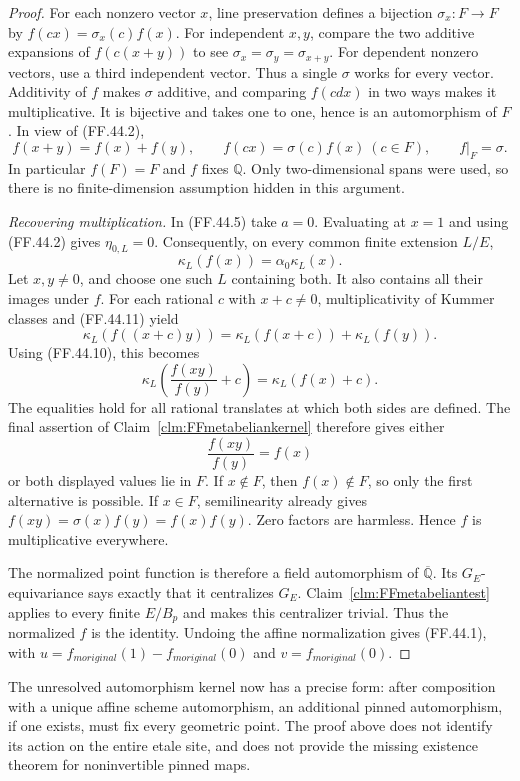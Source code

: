 \begin{proof}
For each nonzero vector \(x\),
line preservation defines a bijection
\(\sigma_x:F\to F\) by
\(f(cx)=\sigma_x(c)f(x)\).
For independent \(x,y\), compare
the two additive expansions of
\(f(c(x+y))\) to see
\(\sigma_x=\sigma_y=\sigma_{x+y}\).
For dependent nonzero vectors,
use a third independent vector.
Thus a single \(\sigma\) works
for every vector. Additivity of
\(f\) makes \(\sigma\) additive,
and comparing \(f(cd x)\) in
two ways makes it multiplicative.
It is bijective and takes one
to one, hence is an automorphism
of \(F\). In view of (FF.44.2),
\[
      f(x+y)=f(x)+f(y),\qquad
      f(cx)=\sigma(c)f(x)\ (c\in F),\qquad
      f|_F=\sigma.
                                                        \tag{FF.44.10}
\]
In particular \(f(F)=F\) and
\(f\) fixes \(\mathbb Q\).
Only two-dimensional spans were
used, so there is no finite-dimension
assumption hidden in this argument.

\emph{Recovering multiplication.}
In (FF.44.5) take \(a=0\).
Evaluating at \(x=1\) and using
(FF.44.2) gives \(\eta_{0,L}=0\).
Consequently, on every common finite
extension \(L/E\),
\[
                            \kappa_L(f(x))
                                   =\alpha_0\kappa_L(x).
                                                        \tag{FF.44.11}
\]
Let \(x,y\ne0\), and choose
one such \(L\) containing both.
It also contains all their images
under \(f\). For each rational
\(c\) with \(x+c\ne0\),
multiplicativity of Kummer classes
and (FF.44.11) yield
\[
       \kappa_L(f((x+c)y))
                     =\kappa_L(f(x+c))+\kappa_L(f(y)).
\]
Using (FF.44.10), this becomes
\[
       \kappa_L\!\left(\frac{f(xy)}{f(y)}+c\right)
                     =\kappa_L(f(x)+c).
                                                        \tag{FF.44.12}
\]
The equalities hold for all rational
translates at which both sides
are defined. The final assertion
of Claim~\ref{clm:FFmetabeliankernel}
therefore gives either
\[
                        \frac{f(xy)}{f(y)}=f(x)
\]
or both displayed values lie in
\(F\). If \(x\notin F\),
then \(f(x)\notin F\), so
only the first alternative is
possible. If \(x\in F\),
semilinearity already gives
\(f(xy)=\sigma(x)f(y)=f(x)f(y)\).
Zero factors are harmless. Hence
\(f\) is multiplicative everywhere.

The normalized point function is
therefore a field automorphism of
\(\overline{\mathbb Q}\).
Its \(G_E\)-equivariance says exactly
that it centralizes \(G_E\).
Claim~\ref{clm:FFmetabeliantest}
applies to every finite \(E/B_p\)
and makes this centralizer trivial.
Thus the normalized \(f\) is
the identity. Undoing the affine
normalization gives (FF.44.1), with
\(u=f_{
m original}(1)-f_{
m original}(0)\)
and \(v=f_{
m original}(0)\).
\end{proof}

The unresolved automorphism kernel
now has a precise form: after
composition with a unique affine
scheme automorphism, an additional
pinned automorphism, if one exists,
must fix every geometric point.
The proof above does not identify
its action on the entire etale
site, and does not provide the
missing existence theorem for
noninvertible pinned maps.
